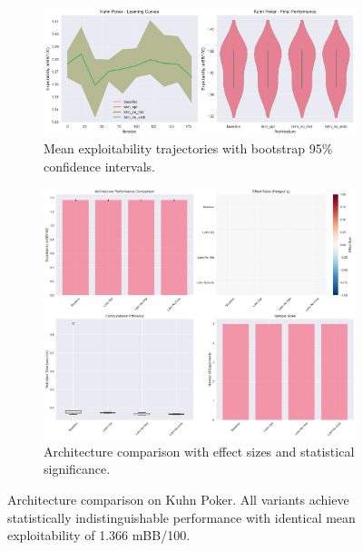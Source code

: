 \documentclass[10pt,twocolumn]{article}
\theoremstyle{definition}
\begin{document}
\begin{figure}[t]
    \centering
    \begin{subfigure}[t]{0.48\textwidth}
        \includegraphics[width=\linewidth]{plots/exploitability_curves_kuhn_poker.png}
        \caption{Mean exploitability trajectories with bootstrap 95\% confidence intervals.}
        \label{fig:architecture_trajectories}
    \end{subfigure}
    \hfill
    \begin{subfigure}[t]{0.48\textwidth}
        \includegraphics[width=\linewidth]{plots/architecture_comparison.png}
        \caption{Architecture comparison with effect sizes and statistical significance.}
        \label{fig:architecture_final}
    \end{subfigure}
    \caption{Architecture comparison on Kuhn Poker. All variants achieve statistically indistinguishable performance with identical mean exploitability of 1.366 mBB/100.}
    \label{fig:architecture_results}
\end{figure}
\end{document}
